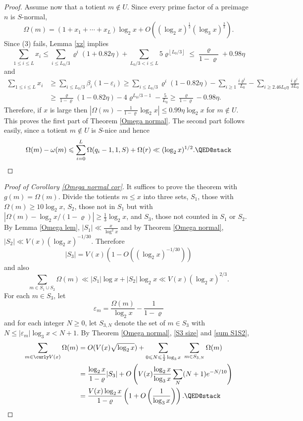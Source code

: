 \documentclass[11pt]{amsart}
\theoremstyle{remark}
\theoremstyle{plain}
\numberwithin{equation}{section}
\newcommand{\be}{\begin{equation}}
\newcommand{\ee}{\end{equation}}
\renewcommand{\b}{\ensuremath{\beta}}
\newcommand{\eps}{\ensuremath{\varepsilon}}
\newcommand{\e}{\ensuremath{\varepsilon}}
\renewcommand{\(}{\left(}
\renewcommand{\)}{\right)}
\newcommand{\fl}[1]{{\ensuremath{\left\lfloor {#1} \right\rfloor}}}
\newcommand{\fancyV}{\curly V}
\renewcommand{\le}{\leqslant}
\renewcommand{\ge}{\geqslant}
\renewcommand{\rho}{\varrho}
\newcommand{\om}{\Omega}
\begin{document}
\begin{proof}
Assume now that a totient $m\not\in U$.  Since every prime factor of a
preimage $n$ is $S$-normal,
\[
 \Omega(m) = (1+x_1+\cdots+x_L)\log_2 x + O\( (\log_2 x)^{\frac12} (\log_3 x)^{\frac32} \).
\]
Since (3) fails, Lemma \ref{xz} implies
\[
 \sum_{1\le i\le L} x_i \le \sum_{i\le L_0/3} \rho^i(1+0.82\eta)+\sum_{L_0/3<i\le L}
5\rho^{\fl{L_0/3}}\le \frac{\rho}{1-\rho}+0.98\eta
\]
and
\begin{align*}
  \sum_{1\le i\le L} x_i &\ge \sum_{i\le L_0/3} \b_i (1-\eps_i) \ge
\sum_{i\le L_0/3} \rho^i(1-0.82\eta)-\sum_{i\ge 1}\frac{i\rho^i}{L_0}-\sum_{i\ge 2.46L_0\eta}
\frac{i\rho^i}{3L_0} \\
&\ge \frac{\rho}{1-\rho}(1-0.82\eta) - 4\rho^{L_0/3-1} - \frac{5}{L_0} \ge  
\frac{\rho}{1-\rho}-0.98\eta.
\end{align*}
Therefore, if $x$ is large then $|\om(m)-\frac{1}{1-\rho}\log_2 x| \le 0.99 \eta\log_2 x$
for $m\not\in U$.
This proves the first part of Theorem \ref{Omega normal}.
The second part follows easily, since a totient $m\not \in U$ is  $S$-nice and hence
\[
\om(m) - \omega(m) \le  \sum_{i=0}^L \om(q_i-1,1,S) + \om(r)
\ll (\log_2 x)^{1/2}. \qedhere
\]
\end{proof}




\begin{proof}[Proof of Corollary \ref{Omega normal cor}]
It suffices to prove the theorem with $g(m)=\om(m)$.  Divide the totients
$m\le x$ into three sets, $S_1$, those with $\om(m)\ge 10\log_2 x$, $S_2$,
those not in $S_1$ but with $| \om(m) - \log_2 x/(1-\rho)| \ge \frac13
\log_2 x$, and $S_3$, those not counted in $S_1$ or $S_2$.  By Lemma
\ref{Omega lem}, 
$|S_1| \ll \frac{x}{\log^2 x}$
and by Theorem \ref{Omega normal},
$|S_2| \ll V(x) (\log_2 x)^{-1/30}.$  Therefore
\be\label{S3 size}
|S_3| = V(x) (1 - O((\log_2 x)^{-1/30}) )
\ee
and also
\be\label{sum S1S2}
\sum_{m\in S_1\cup S_2} \om(m) \ll |S_1| \log x + |S_2| \log_2 x \ll
V(x)(\log_2 x)^{2/3}.
\ee
For each $m\in S_3$, let
$$
\e_m = \frac{\om(m)}{\log_2 x} - \frac{1}{1-\rho}
$$
and for each integer $N\ge 0$,
let $S_{3,N}$ denote the set of $m\in S_3$ with $N\le |\e_m|\log_3 x< N+1$.
By Theorem \ref{Omega normal}, \eqref{S3 size} and \eqref{sum S1S2},
\begin{align*}
\sum_{m\in \fancyV(x)} \om(m) &= O(V(x)\sqrt{\log_2 x}) +
\sum_{0\le N\le \frac12\log_3 x}\,\, \sum_{m\in S_{3,N}} \om(m) \\
&= \frac{\log_2 x}{1-\rho} |S_3| +
O\( V(x) \frac{\log_2 x}{\log_3 x} \sum_N (N+1) e^{-N/10} \) \\
&= \frac{V(x)\log_2 x}{1-\rho} \( 1 + O \( \frac{1}{\log_3 x} \) \).
\qedhere
\end{align*}
\end{proof}
\end{document}
